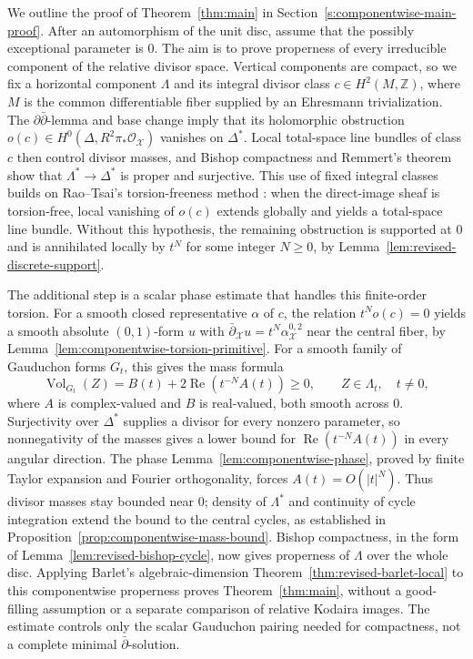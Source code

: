 \documentclass[11pt]{amsart}
\numberwithin{equation}{section}
\theoremstyle{plain}
\theoremstyle{definition}
\newcommand{\Z}{\mathbb Z}
\newcommand{\cO}{\mathcal O}
\newcommand{\cX}{\mathcal X}
\newcommand{\Vol}{\operatorname{Vol}}
\begin{document}
We outline the proof of Theorem~\ref{thm:main} in
Section~\ref{s:componentwise-main-proof}.  After an automorphism of the
unit disc, assume that the possibly exceptional parameter is $0$.
The aim is to prove properness of every irreducible component of the
relative divisor space.  Vertical components are compact, so we fix a
horizontal component $\Lambda$ and its integral divisor class
$c\in H^2(M,\Z)$, where $M$ is the common differentiable fiber supplied
by an Ehresmann trivialization.  The $\partial\bar\partial$-lemma and
base change imply that its holomorphic obstruction
$o(c)\in H^0(\Delta,R^2\pi_*\cO_{\cX})$ vanishes on $\Delta^*$.
Local total-space line bundles of class $c$ then control divisor masses,
and Bishop compactness and Remmert's theorem show that
$\Lambda^*\to\Delta^*$ is proper and surjective.  This use of fixed
integral classes builds on Rao--Tsai's torsion-freeness method
\cite[Propositions~4.12 and~4.13]{RT21}: when the direct-image sheaf is
torsion-free, local vanishing of $o(c)$ extends globally and yields a
total-space line bundle.  Without this hypothesis, the remaining
obstruction is supported at $0$ and is annihilated locally by $t^N$
for some integer $N\ge0$, by Lemma~\ref{lem:revised-discrete-support}.

The additional step is a scalar phase estimate that handles this
finite-order torsion.  For a smooth closed representative $\alpha$ of
$c$, the relation $t^No(c)=0$ yields a smooth absolute $(0,1)$-form $u$
with $\bar\partial_{\cX}u=t^N\alpha^{0,2}_{\cX}$ near the central fiber,
by Lemma~\ref{lem:componentwise-torsion-primitive}.
For a smooth family of Gauduchon forms $G_t$, this gives the mass formula
\begin{equation*}
 \Vol_{G_t}(Z)=B(t)+2\operatorname{Re}\!\left(t^{-N}A(t)\right)\ge0,
 \qquad Z\in\Lambda_t,\quad t\ne0,
\end{equation*}
where $A$ is complex-valued and $B$ is real-valued, both smooth across
$0$.  Surjectivity over $\Delta^*$ supplies a divisor for every nonzero
parameter, so nonnegativity of the masses gives a lower bound for
$\operatorname{Re}(t^{-N}A(t))$ in every angular direction.
The phase Lemma~\ref{lem:componentwise-phase}, proved by finite Taylor expansion and Fourier
orthogonality, forces $A(t)=O(|t|^N)$.  Thus divisor masses stay bounded
near $0$; density of $\Lambda^*$ and continuity of cycle integration
extend the bound to the central cycles, as established in
Proposition~\ref{prop:componentwise-mass-bound}.  Bishop compactness, in the form of
Lemma~\ref{lem:revised-bishop-cycle}, now gives
properness of $\Lambda$ over the whole disc.  Applying Barlet's
algebraic-dimension Theorem~\ref{thm:revised-barlet-local} to this
componentwise properness proves Theorem~\ref{thm:main}, without a
good-filling assumption or a separate comparison of relative Kodaira
images.  The estimate controls only the scalar Gauduchon pairing needed
for compactness, not a complete minimal $\bar\partial$-solution.
\end{document}
